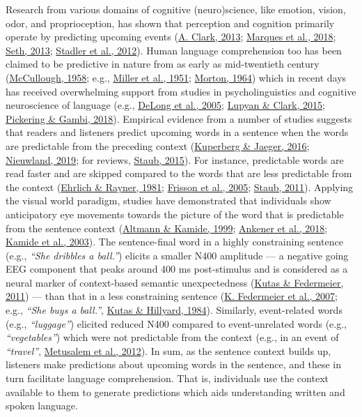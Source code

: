 \documentclass[a4paper, nobind]{templates/ociamthesis}
\begin{document}
Research from various domains of cognitive (neuro)science, like emotion, vision, odor, and proprioception, has shown that perception and cognition primarily operate by predicting upcoming events (\protect\hyperlink{ref-Clark2013}{A. Clark, 2013}; \protect\hyperlink{ref-Marques2018}{Marques et al., 2018}; \protect\hyperlink{ref-Seth2013}{Seth, 2013}; \protect\hyperlink{ref-Stadler2012}{Stadler et al., 2012}).
Human language comprehension too has been claimed to be predictive in nature from as early as mid-twentieth century (\protect\hyperlink{ref-Mccullough1958}{McCullough, 1958}; e.g., \protect\hyperlink{ref-Miller1951}{Miller et al., 1951}; \protect\hyperlink{ref-Morton1964}{Morton, 1964})
which in recent days has received overwhelming support from studies in psycholinguistics and cognitive neuroscience of language (e.g., \protect\hyperlink{ref-Delong2005}{DeLong et al., 2005}; \protect\hyperlink{ref-Lupyan2015}{Lupyan \& Clark, 2015}; \protect\hyperlink{ref-Pickering2018}{Pickering \& Gambi, 2018}).
Empirical evidence from a number of studies suggests that readers and listeners predict upcoming words in a sentence when the words are predictable from the preceding context (\protect\hyperlink{ref-Kuperberg2016}{Kuperberg \& Jaeger, 2016}; \protect\hyperlink{ref-Nieuwland2019}{Nieuwland, 2019}; for reviews, \protect\hyperlink{ref-Staub2015}{Staub, 2015}).
For instance, predictable words are read faster and are skipped compared to the words that are less predictable from the context (\protect\hyperlink{ref-Ehrlich1981}{Ehrlich \& Rayner, 1981}; \protect\hyperlink{ref-Frisson2005}{Frisson et al., 2005}; \protect\hyperlink{ref-Staub2011}{Staub, 2011}).
Applying the visual world paradigm, studies have demonstrated that individuals show anticipatory eye movements towards the picture of the word that is predictable from the sentence context (\protect\hyperlink{ref-Altmann1999}{Altmann \& Kamide, 1999}; \protect\hyperlink{ref-Ankener2018}{Ankener et al., 2018}; \protect\hyperlink{ref-Kamide2003}{Kamide et al., 2003}).
The sentence-final word in a highly constraining sentence (e.g., \emph{``She dribbles a ball.''}) elicits a smaller N400 amplitude --- a negative going EEG component that peaks around 400 ms post-stimulus and is considered as a neural marker of context-based semantic unexpectedness (\protect\hyperlink{ref-Kutas2011}{Kutas \& Federmeier, 2011}) --- than that in a less constraining sentence (\protect\hyperlink{ref-Federmeier2007}{K. Federmeier et al., 2007}; e.g., \emph{``She buys a ball.''}, \protect\hyperlink{ref-Kutas1984}{Kutas \& Hillyard, 1984}).
Similarly, event-related words (e.g., \emph{``luggage''}) elicited reduced N400 compared to event-unrelated words (e.g., \emph{``vegetables''}) which were not predictable from the context (e.g., in an event of \emph{``travel''}, \protect\hyperlink{ref-Metusalem2012}{Metusalem et al., 2012}).
In sum, as the sentence context builds up, listeners make predictions about upcoming words in the sentence, and these in turn facilitate language comprehension.
That is, individuals use the context available to them to generate predictions which aids understanding written and spoken language.
\end{document}
